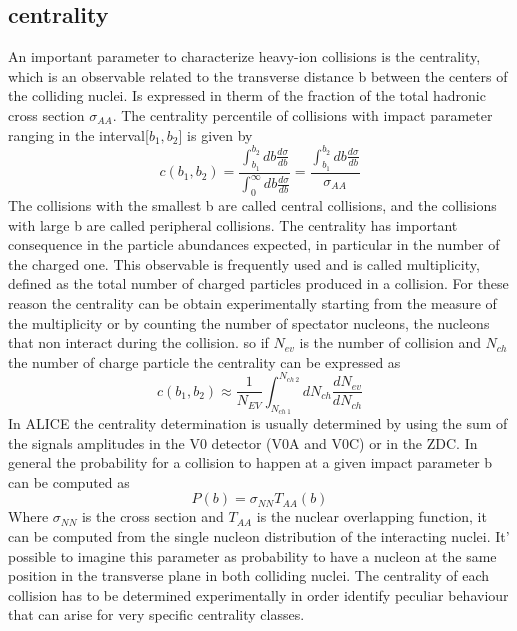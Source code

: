 \documentclass[12pt,a4paper]{book}
\begin{document}
	 	\subsection{centrality} %
	 An important parameter to characterize heavy-ion collisions is the centrality, which is an
	 observable related to the transverse distance b between the centers of the colliding nuclei. Is expressed in therm of the fraction of the total hadronic cross section $\sigma_{AA}$. The centrality percentile of collisions with impact parameter ranging in the interval[$b_1,b_2$] is given by
	 \begin{equation}
	 	c(b_1,b_2)=\frac{\int_{b_1}^{b_2} db \frac{d\sigma}{db}}{\int_{0}^{\infty} db \frac{d\sigma}{db}} = \frac{\int_{b_1}^{b_2} db \frac{d\sigma}{db}}{\sigma_{AA}}
	 	\label{eq:centrrality1}
	 \end{equation}
	 The collisions with the smallest b are
	 called central collisions, and the collisions with large b are called peripheral collisions. The centrality has important consequence in the particle abundances expected, in particular in the number of the charged one. This observable is frequently used and is called multiplicity, defined as the total number of charged particles produced in a collision. For these reason the centrality can be obtain experimentally starting from the measure of the multiplicity or by counting the number of spectator nucleons, the nucleons that non interact during the collision. so if $N_{ev}$ is the number of collision and $N_{ch}$ the number of charge particle the centrality can be expressed as
	 \begin{equation}
	 	c(b_1,b_2) \approx \frac{1}{N_{EV}} \int_{N_{ch \ 1}}^{N_{ch \ 2}} dN_{ch} \frac{dN_{ev}}{dN_{ch}}
	 	\label{eq:centrrality2}
	 \end{equation}
	 In ALICE the centrality determination is usually determined by using the sum of the signals amplitudes in the V0 detector (V0A and V0C) or in the ZDC. In general the probability for a collision to happen at a given impact parameter b can be computed as
	 \begin{equation}
	 	P(b)= \sigma_{NN} T_{AA}(b)
	 	\label{eq:prob_collision}
	 \end{equation}
	 Where $\sigma_{NN}$ is the cross section and $T_{AA}$ is the nuclear overlapping function, it can be computed from the single nucleon distribution of the interacting nuclei. It' possible to imagine this parameter as probability to have a nucleon at the same position in the transverse plane in both colliding nuclei. The centrality of each collision has to be determined experimentally in order identify	peculiar behaviour that can arise for very specific centrality classes. \cite{amsdottorato9036}
	
\end{document}
